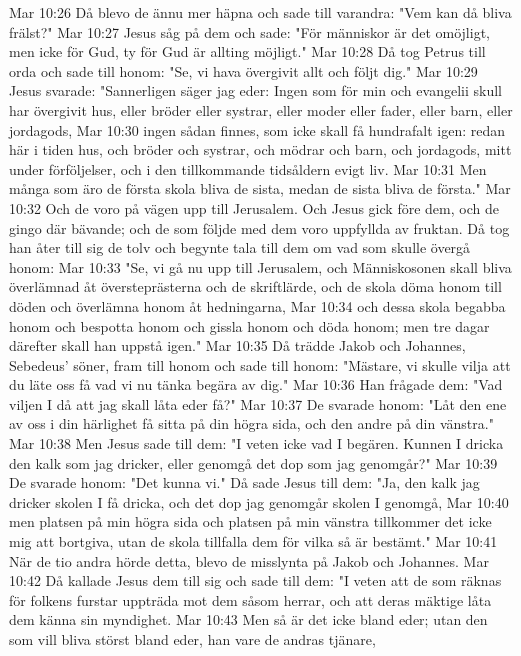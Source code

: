 Mar 10:26  Då blevo de ännu mer häpna och sade till varandra: "Vem kan då bliva frälst?"
Mar 10:27  Jesus såg på dem och sade: "För människor är det omöjligt, men icke för Gud, ty för Gud är allting möjligt."
Mar 10:28  Då tog Petrus till orda och sade till honom: "Se, vi hava övergivit allt och följt dig."
Mar 10:29  Jesus svarade: "Sannerligen säger jag eder: Ingen som för min och evangelii skull har övergivit hus, eller bröder eller systrar, eller moder eller fader, eller barn, eller jordagods,
Mar 10:30  ingen sådan finnes, som icke skall få hundrafalt igen: redan här i tiden hus, och bröder och systrar, och mödrar och barn, och jordagods, mitt under förföljelser, och i den tillkommande tidsåldern evigt liv.
Mar 10:31  Men många som äro de första skola bliva de sista, medan de sista bliva de första."
Mar 10:32  Och de voro på vägen upp till Jerusalem. Och Jesus gick före dem, och de gingo där bävande; och de som följde med dem voro uppfyllda av fruktan. Då tog han åter till sig de tolv och begynte tala till dem om vad som skulle övergå honom:
Mar 10:33  "Se, vi gå nu upp till Jerusalem, och Människosonen skall bliva överlämnad åt översteprästerna och de skriftlärde, och de skola döma honom till döden och överlämna honom åt hedningarna,
Mar 10:34  och dessa skola begabba honom och bespotta honom och gissla honom och döda honom; men tre dagar därefter skall han uppstå igen."
Mar 10:35  Då trädde Jakob och Johannes, Sebedeus' söner, fram till honom och sade till honom: "Mästare, vi skulle vilja att du läte oss få vad vi nu tänka begära av dig."
Mar 10:36  Han frågade dem: "Vad viljen I då att jag skall låta eder få?"
Mar 10:37  De svarade honom: "Låt den ene av oss i din härlighet få sitta på din högra sida, och den andre på din vänstra."
Mar 10:38  Men Jesus sade till dem: "I veten icke vad I begären. Kunnen I dricka den kalk som jag dricker, eller genomgå det dop som jag genomgår?"
Mar 10:39  De svarade honom: "Det kunna vi." Då sade Jesus till dem: "Ja, den kalk jag dricker skolen I få dricka, och det dop jag genomgår skolen I genomgå,
Mar 10:40  men platsen på min högra sida och platsen på min vänstra tillkommer det icke mig att bortgiva, utan de skola tillfalla dem för vilka så är bestämt."
Mar 10:41  När de tio andra hörde detta, blevo de misslynta på Jakob och Johannes.
Mar 10:42  Då kallade Jesus dem till sig och sade till dem: "I veten att de som räknas för folkens furstar uppträda mot dem såsom herrar, och att deras mäktige låta dem känna sin myndighet.
Mar 10:43  Men så är det icke bland eder; utan den som vill bliva störst bland eder, han vare de andras tjänare,
